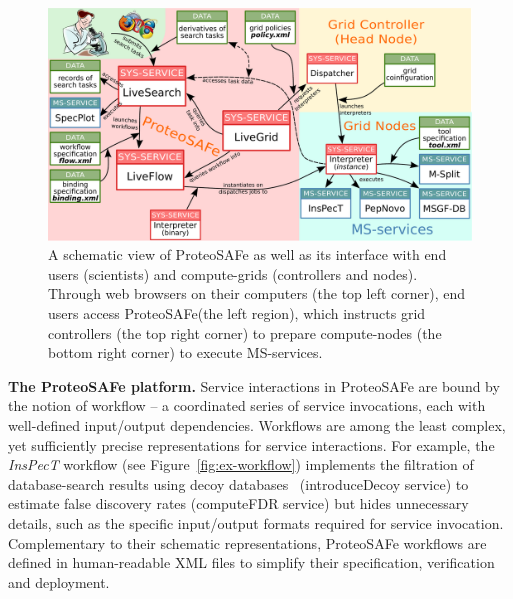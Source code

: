 \documentclass[arial,11pt]{article}
\newcommand{\SF}[1]{\textsf{#1}}
\newcommand{\SYSTEM}[0]{\SF{ProteoSAFe}\xspace}
\begin{document}
\begin{figure}[htb]
  \centering
  \includegraphics[width=\textwidth]{figures/arch.pdf}
  \caption{\footnotesize A schematic view of \SYSTEM as well as its interface with end users (scientists) and compute-grids (controllers and nodes).
    Through web browsers on their computers (the top left corner), end users access \SYSTEM (the left region),
      which instructs grid controllers (the top right corner) to prepare compute-nodes (the bottom right corner) to execute MS-services.}
  \label{fig:arch}
\end{figure}

{\bf The ProteoSAFe platform.} Service interactions in \SYSTEM are bound by the notion of workflow -- a coordinated series of service invocations, each with well-defined input/output dependencies. Workflows are among the least complex, yet sufficiently precise representations for service interactions. For example, the {\em  InsPecT} workflow (see Figure~\ref{fig:ex-workflow}) implements the filtration of database-search results using decoy databases~\cite{Elias:2007} (\SF{introduceDecoy} service) to estimate false discovery rates (\SF{computeFDR} service) but hides unnecessary details, such as the specific input/output formats required for service invocation.
Complementary to their schematic representations, \SYSTEM workflows are defined in human-readable XML files to simplify their specification, verification and deployment.
\end{document}
